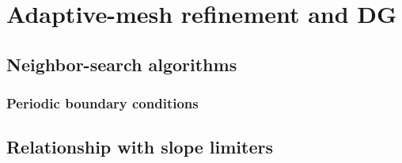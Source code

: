 \section{Adaptive-mesh refinement and DG}

\subsection{Neighbor-search algorithms}
\subsubsection{Periodic boundary conditions}
\subsection{Relationship with slope limiters}